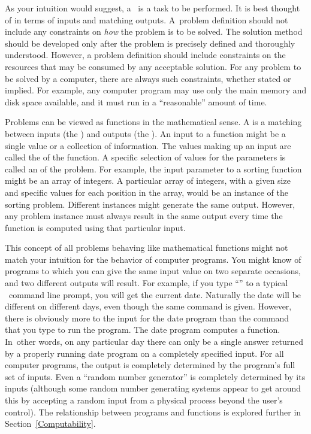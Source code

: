 As your intuition would suggest, a~ is
a task to be performed.
It is best thought of in terms of inputs and matching outputs.
A~problem definition should not include any constraints on
\emph{how} the problem is to be solved.
The solution method should be developed only after the problem is
precisely defined and thoroughly understood.
However, a problem definition should include constraints on the
resources that may be consumed by any acceptable
solution.
For any problem to be solved by a computer, there are always such
constraints, whether stated or implied.
For example, any computer program may use only the main memory
and disk space available, and it must run in a ``reasonable'' amount
of time.

Problems can be viewed as functions in the mathematical sense.
A  is a matching
between inputs (the ) and outputs (the
).
An input to a function might be a single value or a
collection of information.
The values making up an input are called the
 of the function.
A specific selection of values for the parameters is called an
 of the problem.
For example, the input parameter to a sorting function might be an
array of integers.
A particular array of integers, with a given size and specific values
for each position in the array, would be an instance of the sorting
problem.
Different instances might generate the same output.
However, any problem instance must always result in the same output
every time the function is computed using that particular input.

This concept of all problems behaving like mathematical functions
might not match your intuition for the behavior of computer programs.
You might know of programs to which you can give the same input value
on two separate occasions, and two different outputs will result.
For example, if you type ``'' to a typical \UNIX\ command
line prompt, you will get the current date.
Naturally the date will be different on different days, even though
the same command is given.
However, there is obviously more to the input for the date program
than the command that you type to run the program.
The date program computes a function.
In~other words, on any particular day there can only be a single
answer returned by a properly running date program on a completely
specified input.
For all computer programs, the output is completely determined by the
program's full set of inputs.
Even a ``random number generator'' is completely determined by its
inputs (although some random number generating systems appear to get
around this by accepting a random input from a physical
process beyond the user's control).
The relationship between programs and functions is explored further in
Section~\ref{Computability}.


